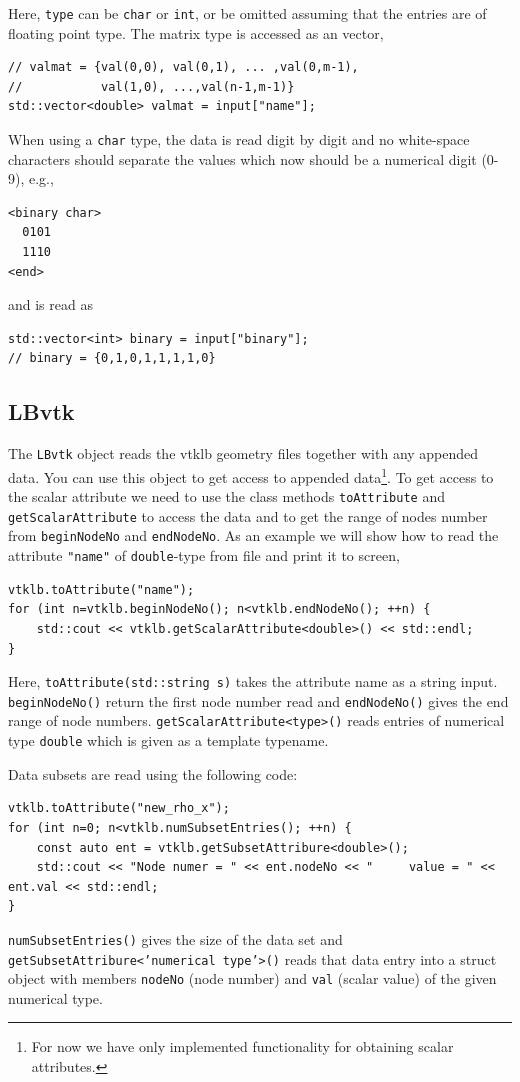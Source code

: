\documentclass[11pt,a4paper]{report}
\begin{document}
Here, \texttt{type} can be \texttt{char} or \texttt{int}, or be omitted assuming that the entries are of floating point type. The matrix type is accessed as an vector, 
\begin{verbatim}
// valmat = {val(0,0), val(0,1), ... ,val(0,m-1), 
//           val(1,0), ...,val(n-1,m-1)}
std::vector<double> valmat = input["name"];
\end{verbatim}
When using a \texttt{char} type, the data is read digit by digit and no white-space characters should separate the values which now should be a numerical digit (0-9), e.g.,
\begin{verbatim}
<binary char>   
  0101
  1110
<end>
\end{verbatim}
and is read as
\begin{verbatim}
std::vector<int> binary = input["binary"]; 
// binary = {0,1,0,1,1,1,1,0} 
\end{verbatim}   

\subsection{LBvtk}\label{sec:lbvtk}

The \texttt{LBvtk} object reads the vtklb geometry files together with any appended data. You can use this object to get access to appended data\footnote{For now we have only implemented functionality for obtaining scalar attributes.}. To get access to the scalar attribute we need to use the class methods \texttt{toAttribute} and \texttt{getScalarAttribute} to access the data and to get the range of nodes number from \texttt{beginNodeNo} and \texttt{endNodeNo}. As an example we will show how to read the attribute \texttt{"name"} of \texttt{double}-type from file and print it to screen,
\begin{verbatim}
vtklb.toAttribute("name");
for (int n=vtklb.beginNodeNo(); n<vtklb.endNodeNo(); ++n) {
    std::cout << vtklb.getScalarAttribute<double>() << std::endl;
}
\end{verbatim}
Here, \texttt{toAttribute(std::string s)} takes the attribute name as a string input. \texttt{beginNodeNo()} return the first node number read and \texttt{endNodeNo()} gives the end range of node numbers. \texttt{getScalarAttribute<type>()} reads entries of numerical type \texttt{double} which is given as a template typename.

Data subsets are read using the following code:
\begin{verbatim}
vtklb.toAttribute("new_rho_x");
for (int n=0; n<vtklb.numSubsetEntries(); ++n) {
	const auto ent = vtklb.getSubsetAttribure<double>();
	std::cout << "Node numer = " << ent.nodeNo << "     value = " << ent.val << std::endl;
}
\end{verbatim}
\texttt{numSubsetEntries()} gives the size of the data set and \texttt{getSubsetAttribure<'numerical type'>()} reads that data entry into a struct object with members \texttt{nodeNo} (node number) and \texttt{val} (scalar value) of the given numerical type.
\end{document}
